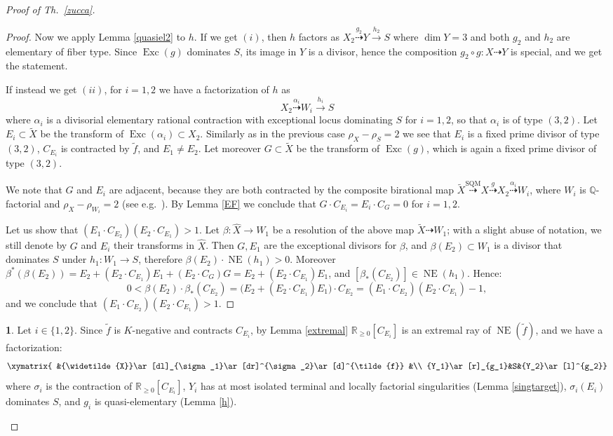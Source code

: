 \documentclass[a4paper,12pt]{amsart}
\theoremstyle{definition}
\newtheorem{prg}[thm]{}
\numberwithin{figure}{section}
\numberwithin{table}{section}
\newcommand{\w}{\widetilde}
\newcommand{\wi}{\widehat}
\newcommand{\Q}{\mathbb{Q}}
\newcommand{\R}{\mathbb{R}}
\newcommand{\NE}{\operatorname{NE}}
\newcommand{\Exc}{\operatorname{Exc}}
\begin{document}
\begin{proof}[Proof of Th.~\ref{zucca}]
\begin{proof}
  Now we apply Lemma \ref{quasiel2} to $h$. If we get $(i)$, then $h$ factors as
  $X_2\stackrel{g_2}{\dasharrow} Y\stackrel{h_2}{\to} S$ where $\dim Y=3$ and both $g_2$ and $h_2$ are elementary of fiber type. Since $\Exc(g)$ dominates $S$, its image in $Y$ is a divisor, hence the composition $g_2\circ g\colon X\dasharrow Y$ is special, and we get  the statement.

  If instead we get $(ii)$, for $i=1,2$ we have a factorization of $h$ as
  $$X_2\stackrel{\alpha_i}{\dasharrow} W_i\stackrel{h_i}{\to} S$$
   where  $\alpha_i$ is a divisorial elementary rational contraction with exceptional locus dominating $S$ for $i=1,2$, so that $\alpha_i$ is of type $(3,2)$.
  Let $E_i\subset \w{X}$ be the transform of $\Exc(\alpha_{i})\subset X_2$. Similarly as in the previous case $\rho_X-\rho_S=2$ we see that $E_i$ is a fixed prime divisor of type $(3,2)$, $C_{E_i}$ is contracted by $\tilde{f}$, and $E_1\neq E_2$. Let moreover  $G\subset \w{X}$ be the transform of $\Exc(g)$, which is again a fixed prime divisor of type $(3,2)$.

  We note that $G$ and $E_i$ are adjacent, because they are both contracted by the composite birational map $\w{X}\stackrel{\text{SQM}}{\dasharrow} X\stackrel{g}{\dasharrow}X_2\stackrel{\alpha_i}{\dasharrow}W_{i}$, where $W_i$ is $\Q$-factorial and $\rho_X-\rho_{W_i}=2$ (see e.g.\ \cite[proof of Lemma 4.2]{small}). 
  By Lemma \ref{EF} we conclude that $G\cdot C_{E_i}=E_i\cdot C_{G}=0$ for $i=1,2$.

 Let us show that
$({E}_{1}\cdot C_{{E}_{2}})({E}_{2}\cdot C_{{E}_{1}})> 1$.
Let $\beta\colon\wi{X}\to W_{1}$ be a resolution of the above map $\w{X}\dasharrow W_{1}$; with a slight abuse of notation, we still denote by $G$ and $E_i$ their transforms in $\wi{X}$.
Then $G,E_1$ are the exceptional divisors for $\beta$, and
$\beta(E_2)\subset W_{1}$ is a divisor that dominates $S$ under $h_1\colon W_1\to S$, therefore
 $\beta(E_2)\cdot \NE(h_{1})>0$. Moreover
$\beta^*(\beta(E_2))=E_2+(E_2\cdot C_{E_1})E_1+(E_2\cdot C_{G})G=E_2+(E_2\cdot C_{E_1})E_1$, and  $[\beta_*(C_{E_2})]\in\NE(h_{1})$.
Hence:
$$0<\beta(E_2)\cdot \beta_*(C_{E_2})=\bigl(E_2+(E_2\cdot C_{E_1})E_1\bigr)
\cdot C_{E_2}=(E_1\cdot C_{E_2})(E_2\cdot C_{E_1})-1,$$
and we conclude that  $(E_{1}\cdot C_{E_{2}})(E_{2}\cdot C_{E_{1}})> 1$.
\end{proof}
\begin{prg}\label{torteria}
  Let $i\in\{1,2\}$. Since $\tilde{f}$ is $K$-negative and  contracts $C_{E_i}$, by Lemma \ref{extremal} 
  $\R_{\geq 0}[C_{E_i}]$ is an extremal ray of $\NE(\tilde{f})$,
and we have a
factorization:
$$\xymatrix{ &{\w{X}}\ar[dl]_{\sigma_1}\ar[dr]^{\sigma_2}\ar[d]^{\tilde{f}} &\\
  {Y_1}\ar[r]_{g_1}&S&{Y_2}\ar[l]^{g_2}}$$
  where $\sigma_i$ is the contraction
  of $\R_{\geq 0}[C_{E_i}]$, $Y_i$ has at most isolated terminal and locally factorial singularities (Lemma \ref{singtarget}), $\sigma_i(E_i)$ dominates $S$, and $g_i$ is quasi-elementary (Lemma \ref{h}).


\end{prg}
\end{proof}
\end{document}
